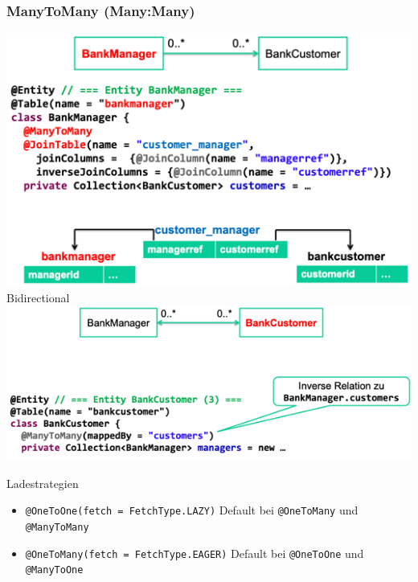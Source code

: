 \documentclass[a4paper, landscape, 8pt]{scrartcl}
\begin{document}
\begin{multicols*}{4}
        \subsubsection{ManyToMany (Many:Many)}
        \includegraphics[width=\columnwidth]{graphic/08-many-to-many}
        Bidirectional\\
        \includegraphics[width=\columnwidth]{graphic/09-bidirectional-many-to-many}
        
        Ladestrategien \\
        \begin{itemize}
            \item \texttt{@OneToOne(fetch = FetchType.LAZY)}
            \subitem Default bei \texttt{@OneToMany} und \texttt{@ManyToMany}
            \item \texttt{@OneToMany(fetch = FetchType.EAGER)}
            \subitem Default bei \texttt{@OneToOne} und \texttt{@ManyToOne}
        \end{itemize}


\end{multicols*}
\end{document}
